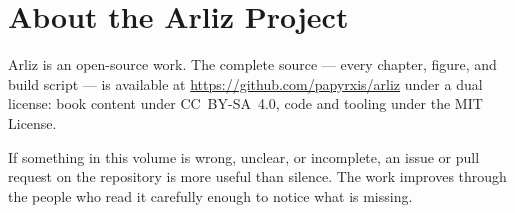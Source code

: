 \chapter*{About the Arliz Project}

Arliz is an open-source work. The complete source --- every chapter, figure,
and build script --- is available at \url{https://github.com/papyrxis/arliz}
under a dual license: book content under CC~BY-SA~4.0, code and tooling
under the MIT License.

If something in this volume is wrong, unclear, or incomplete, an issue or
pull request on the repository is more useful than silence. The work
improves through the people who read it carefully enough to notice what
is missing.

\clearpage

